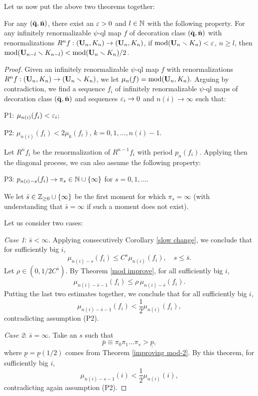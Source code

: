 Let us now put the above two theorems together:

\begin{cor}\label{improving-3}
 For any $(\bar{{\mathbf{q}}}, \bar{{\mathbf{n}}})$,   there exist an ${\varepsilon}>0$ and $l\in {\Bbb N}$ with the following property.
For any  infinitely renormalizable $\psi$-ql map $f$  of decoration class $(\bar{{\mathbf{q}}}, \bar {{\mathbf{n}}})$
with renormalizations $R^n f: ({\mathbf{U}}_n, K_n) \rightarrow ({\mathbf{U}}_n, K_n)$,
if $\operatorname{mod}({\mathbf{U}}_n\smallsetminus K_n)< {\varepsilon}$, $n\geq l$,  then $\operatorname{mod} ({\mathbf{U}}_{n-l}\smallsetminus K_{n-l})<\operatorname{mod}({\mathbf{U}}_n\smallsetminus K_n) /2$.
\end{cor}



\begin{proof}
  Given an infinitely renormalizable $\psi$-ql map $f$ with renormalizations
$R^n f: ({\mathbf{U}}_n, K_n)\rightarrow ({\mathbf{U}}_n\smallsetminus K_n)$, we let $\mu_n(f)= \operatorname{mod} ({\mathbf{U}}_n, K_n).$
Arguing by contradiction, we find a sequence $f_i$ of infinitely renormalizable $\psi$-ql maps
of decoration class $(\bar{{\mathbf{q}}}, \bar{{\mathbf{n}}})$ and sequences ${\varepsilon}_i\to 0$ and $n(i) \to \infty$
such that:

\ssk\nin P1:
   $\mu_{n(i)}(f_i) <{\varepsilon}_i$;

\ssk\nin P2:
  $ \mu_{n(i)}(f_i) < 2 \mu_k (f_i)$,  $k=0,1,\dots,  n(i)-1 $.
\ssk


Let $R^n f_i $ be the renormalization of $R^{n-1} f_i$ with period $p_n(f_i)$.
Applying  then the diagonal process,  we can also assume the following property:


\ssk\nin P3:
   $p_{n(i)-s}(f_i)\to \pi_s\in {\Bbb N} \cup \{\infty\}$ for  $s=0,1, \dots$.
\ssk

We  let $\bar s \in {\Bbb Z}_{\geq 0} \cup\{\infty\}$ be the first moment for which $\pi_s=\infty$
(with understanding that $\bar s=\infty$ if such a moment does not exist).

Let us consider two cases:

\ssk
{\it Case 1}: $\bar s<\infty$.
Applying consecutively Corollary \ref{slow change}, we conclude that for sufficiently big $i$,
$$
   \mu_{n(i)-s}(f_i) \leq C^s \mu_{n(i)}(f_i), \quad s\leq \bar s.
$$
Let $\rho\in (0, 1/2 C^{\bar s})$.
By Theorem \ref{mod improve}, for all sufficiently big $i$,
$$
   \mu_{n(i)-\bar s-1}(f_i) \leq \rho\,  \mu_{n(i)-\bar s}(f_i).
$$
 Putting the last two estimates together, we conclude that for all sufficiently big $i$,
$$
   \mu_{n(i)-\bar s-1}(f_i) < \frac{1}{2} \mu_{n(i)}(f_i),
$$
  contradicting assumption (P2).

\ssk
{\it Case 2}: $\bar s=\infty$.
  Take an $s$ such that
$$
   \bar p\equiv \pi_0 \pi_1\dots \pi_s > \underline p,
$$
where $\underline p = \underline p(1/2)$ comes from Theorem \ref{improving mod-2}.
By this theorem, for sufficiently big $i$,
$$
   \mu_{n(i)- s - 1}(i) < \frac{1}{2} \mu_{n(i)}(i),
$$
contradicting again assumption (P2).
\end{proof}



